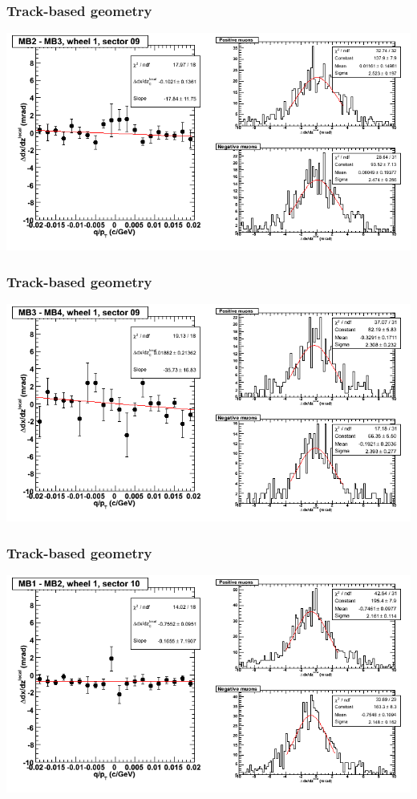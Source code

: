 \documentclass[compress]{beamer}
\begin{document}
\begin{frame}
\frametitle{Track-based geometry}
\includegraphics[width=\linewidth]{NOV4_segdiffs/dt13_slope_D_09_23.png}
\end{frame}

\begin{frame}
\frametitle{Track-based geometry}
\includegraphics[width=\linewidth]{NOV4_segdiffs/dt13_slope_D_09_34.png}
\end{frame}

\begin{frame}
\frametitle{Track-based geometry}
\includegraphics[width=\linewidth]{NOV4_segdiffs/dt13_slope_D_10_12.png}
\end{frame}
\end{document}
